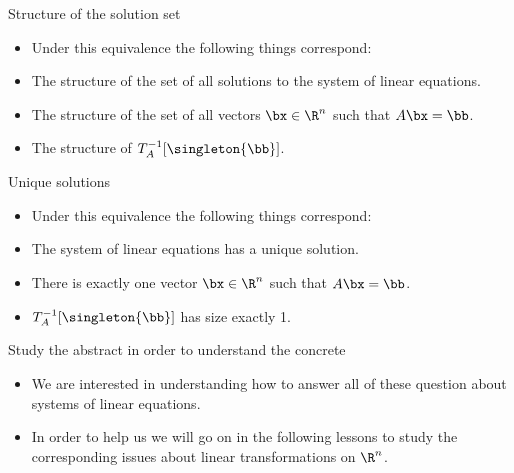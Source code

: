 \documentclass[handout]{beamer}
\begin{document}

\begin{frame}{Structure of the solution set}

\begin{itemize}
\item Under this equivalence the following things correspond:
\item The structure of the set of all solutions to the system of linear equations.
\item The structure of the set of all vectors $\bx \in \R^n$ such that $A \bx = \bb$.
\item The structure of $T_A^{-1}[\singleton{\bb}]$.
\end{itemize}

\end{frame}


\begin{frame}{Unique solutions}

\begin{itemize}
\item Under this equivalence the following things correspond:
\item The system of linear equations has a unique solution.
\item There is exactly one vector $\bx \in \R^n$ such that $A \bx = \bb$.
\item $T_A^{-1}[\singleton{\bb}]$ has size exactly 1.
\end{itemize}

\end{frame}


\begin{frame}{Study the abstract in order to understand the concrete}

\begin{itemize}
\item We are interested in understanding how to answer all of these question
about systems of linear equations.
\item In order to help us we will go on in the following lessons to
study the corresponding issues about linear transformations on $\R^n$.
\end{itemize}

\end{frame}
\end{document}
